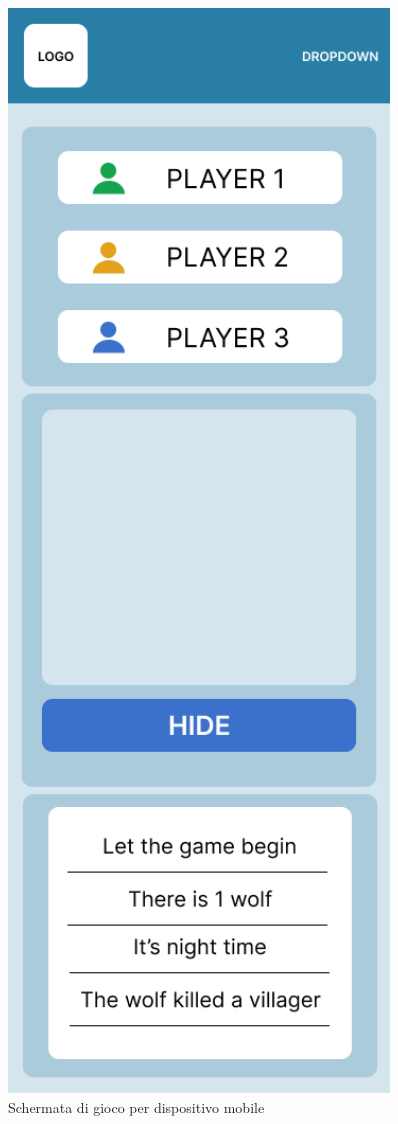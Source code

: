 \begin{figure}[H]
\begin{minipage}{0.45\textwidth}
        \label{fig:androidLogin}
    \end{minipage}\hfill
    \begin{minipage}{0.45\textwidth}
        \centering
        \includegraphics[width=0.9\textwidth]{img/figma/AndroidLarge-2.png} \caption{Schermata di gioco per dispositivo mobile}
        \label{fig:androidGame}
    \end{minipage}
\end{figure}

